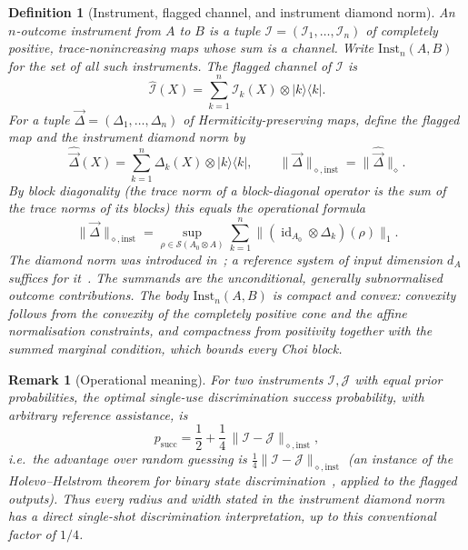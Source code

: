\documentclass[11pt,a4paper]{article}
\newtheorem{definition}[theorem]{Definition}
\newtheorem{remark}[theorem]{Remark}
\newcommand{\Sstate}{\mathcal{S}}
\newcommand{\Inst}{\mathrm{Inst}}
\newcommand{\id}{\operatorname{id}}
\newcommand{\vD}{\vec{\Delta}}
\begin{document}
\begin{definition}[Instrument, flagged channel, and instrument diamond norm]
An $n$-outcome instrument from $A$ to $B$ is a tuple $\mathcal I=(\mathcal I_1,\dots,\mathcal I_n)$ of completely positive, trace-nonincreasing maps whose sum is a channel. Write $\Inst_n(A,B)$ for the set of all such instruments. The flagged channel of $\mathcal I$ is
\[
\widehat{\mathcal I}(X)=\sum_{k=1}^n\mathcal I_k(X)\otimes|k\rangle\langle k|.
\]
For a tuple $\vD=(\Delta_1,\dots,\Delta_n)$ of Hermiticity-preserving maps, define the flagged map and the instrument diamond norm by
\[
\widehat{\vD}(X)=\sum_{k=1}^n\Delta_k(X)\otimes|k\rangle\langle k|,
\qquad
\|\vD\|_{\diamond,\mathrm{inst}}=\|\widehat{\vD}\|_\diamond.
\]
By block diagonality (the trace norm of a block-diagonal operator is the sum of the trace norms of its blocks) this equals the operational formula
\[
\|\vD\|_{\diamond,\mathrm{inst}}
=\sup_{\rho\in\Sstate(A_0\otimes A)}
\sum_{k=1}^n\|(\id_{A_0}\otimes\Delta_k)(\rho)\|_1.
\]
The diamond norm was introduced in~\cite{AharonovKitaevNisan1998}; a reference system of input dimension $d_A$ suffices for it~\cite{Watrous2018}. The summands are the unconditional, generally subnormalised outcome contributions. The body $\Inst_n(A,B)$ is compact and convex: convexity follows from the convexity of the completely positive cone and the affine normalisation constraints, and compactness from positivity together with the summed marginal condition, which bounds every Choi block.
\end{definition}

\begin{remark}[Operational meaning]
\label{rem:operational}
For two instruments $\mathcal I,\mathcal J$ with equal prior probabilities, the optimal single-use discrimination success probability, with arbitrary reference assistance, is
\[
p_{\mathrm{succ}}
=\frac12+\frac14\,\|\mathcal I-\mathcal J\|_{\diamond,\mathrm{inst}},
\]
i.e.\ the advantage over random guessing is $\tfrac14\|\mathcal I-\mathcal J\|_{\diamond,\mathrm{inst}}$ (an instance of the Holevo--Helstrom theorem for binary state discrimination~\cite{Helstrom1976}, applied to the flagged outputs). Thus every radius and width stated in the instrument diamond norm has a direct single-shot discrimination interpretation, up to this conventional factor of $1/4$.
\end{remark}
\end{document}
